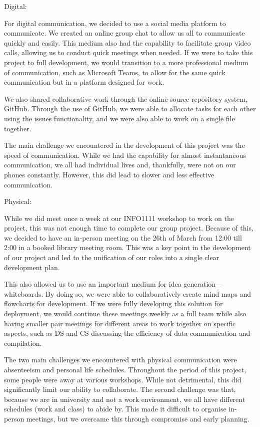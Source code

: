 \documentclass[a4paper, 11pt]{report}
\begin{document}
Digital:

For digital communication, we decided to use a social media platform to communicate. We created an online group chat to allow us all to communicate quickly and easily. This medium also had the capability to facilitate group video calls, allowing us to conduct quick meetings when needed. If we were to take this project to full development, we would transition to a more professional medium of communication, such as Microsoft Teams, to allow for the same quick communication but in a platform designed for work.

We also shared collaborative work through the online source repository system, GitHub. Through the use of GitHub, we were able to allocate tasks for each other using the issues functionality, and we were also able to work on a single file together.

The main challenge we encountered in the development of this project was the speed of communication. While we had the capability for almost instantaneous communication, we all had individual lives and, thankfully, were not on our phones constantly. However, this did lead to slower and less effective communication.

Physical:

While we did meet once a week at our INFO1111 workshop to work on the project, this was not enough time to complete our group project. Because of this, we decided to have an in-person meeting on the 26th of March from 12:00 till 2:00 in a booked library meeting room. This was a key point in the development of our project and led to the unification of our roles into a single clear development plan.

This also allowed us to use an important medium for idea generation—whiteboards. By doing so, we were able to collaboratively create mind maps and flowcharts for development. If we were fully developing this solution for deployment, we would continue these meetings weekly as a full team while also having smaller pair meetings for different areas to work together on specific aspects, such as DS and CS discussing the efficiency of data communication and compilation.

The two main challenges we encountered with physical communication were absenteeism and personal life schedules. Throughout the period of this project, some people were away at various workshops. While not detrimental, this did significantly limit our ability to collaborate. The second challenge was that, because we are in university and not a work environment, we all have different schedules (work and class) to abide by. This made it difficult to organise in-person meetings, but we overcame this through compromise and early planning.
\end{document}
